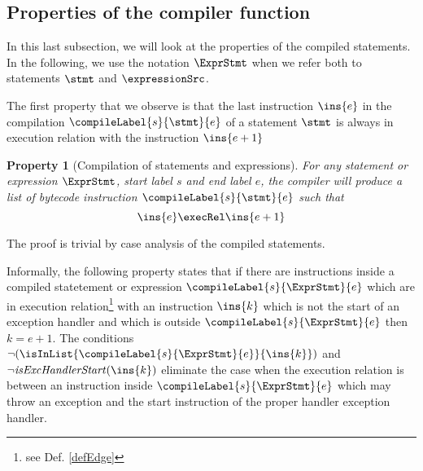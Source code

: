 
\newtheorem{compProp0}{Property}[subsection]
\newtheorem{compProp1}[compProp0]{Property} %
\newtheorem{compProp2}[compProp0]{Property} %
\newtheorem{compProp6}[compProp0]{Property} %
\newtheorem{compProp3}[compProp0]{Property} %
\newtheorem{compProp7}[compProp0]{Property} %
\newtheorem{compProp4}[compProp0]{Property} %
\newtheorem{compProp5}[compProp0]{Property} %
\newtheorem{compProp8}[compProp0]{Property} %
\newtheorem{compProp9}[compProp0]{Property}
\newtheorem{compProp10}[compProp0]{Property}
\newtheorem{seqInstr}{Definition}[subsection]




 
\newcommand{\isStartExc}[1]{\mbox{\rm\textit{isExcHandlerStart}}(#1)}
\subsection{Properties of the compiler function}\label{compile:prop}

In this last subsection, we will look at the properties of the compiled statements.
In the following, we use the notation $\ExprStmt$ when we refer both to statements $\stmt$ and $\expressionSrc$.
 
The first property that we observe is that the last instruction $\ins{e}$ in the compilation $\compileLabel{s}{\stmt}{e}$  of a statement $\stmt$
is always in execution relation with the  instruction $\ins{e + 1}$
\begin{compProp0}[Compilation of statements and expressions]\label{compile:prop:compProp0}
 For any statement or expression $\ExprStmt$, start label $s$ and end label $e$,
    the compiler will produce a list of bytecode instruction $\compileLabel{s}{\stmt}{e}$ such that 
     $$ \ins{e} \execRel \ins{e+1}$$
\end{compProp0}
The proof is trivial by case analysis of the compiled statements.


Informally, the following property states  that  if there are instructions inside a compiled statetement or expression 
 $\compileLabel{s}{\ExprStmt}{e}$ which are in execution relation\footnote{see Def. \ref{defEdge}}  with an instruction 
$\ins{k}$ which is not the start of an exception handler and which is outside $\compileLabel{s}{\ExprStmt }{e}$
 then   $ k  = e +1$. 
 The conditions  $ \neg (  \isInList{\compileLabel{s}{\ExprStmt}{e} }{\ins{k}} )$ and \\
$\neg \isStartExc{\ins{k}}$  eliminate the case when the execution relation is between an instruction inside 
 $\compileLabel{s}{\ExprStmt}{e}$ which may throw an exception and the start instruction of the proper handler exception handler.

